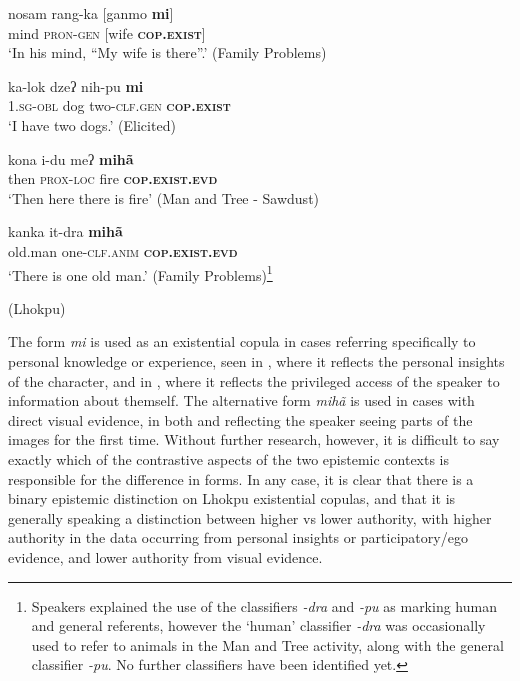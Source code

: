 \begin{exe}
       \ex\label{e:Methods:LhokpuDistinction}
       \begin{xlist}
              \ex\label{e:Methods:LhokpuDistinction:mi1}
              \gll nosam rang-ka [ganmo \textbf{mi}] \\
              mind \textsc{pron-gen} [wife \textbf{\textsc{cop.exist}}] \\
              \glt `In his mind, “My wife is there”.' (Family Problems)

              \ex \label{e:Methods:LhokpuDistinction:mi2}
              \gll ka-lok dzeʔ nih-pu \textbf{mi} \\
              \textsc{1.sg-obl} dog two-\textsc{clf.gen} \textbf{\textsc{cop.exist}} \\
              \glt `I have two dogs.' (Elicited)

              \ex \label{e:Methods:LhokpuDistinction:miha1}
              \gll kona i-du meʔ \textbf{mihã} \\
              then \textsc{prox-loc} fire \textbf{\textsc{cop.exist.evd}} \\
              \glt `Then here there is fire' (Man and Tree - Sawdust)

              \ex \label{e:Methods:LhokpuDistinction:miha2}
              \gll kanka it-dra \textbf{mihã} \\
              old.man one-\textsc{clf.anim}  \textbf{\textsc{cop.exist.evd}} \\
              \glt `There is one old man.' (Family Problems)\footnote{Speakers explained the use of the classifiers \textit{-dra} and \textit{-pu} as marking human and general referents, however the `human' classifier \textit{-dra} was occasionally used to refer to animals in the Man and Tree activity, along with the general classifier \textit{-pu}. No further classifiers have been identified yet.}
       \end{xlist}
       (Lhokpu)
\end{exe}

The form \textit{mi} is used as an existential copula in cases referring specifically to personal knowledge or experience, seen in , where it reflects the personal insights of the character, and in , where it reflects the privileged access of the speaker to information about themself. The alternative form \textit{mihã} is used in cases with direct visual evidence, in both  and  reflecting the speaker seeing parts of the images for the first time. Without further research, however, it is difficult to say exactly which of the contrastive aspects of the two epistemic contexts is responsible for the difference in forms. In any case, it is clear that there is a binary epistemic distinction on Lhokpu existential copulas, and that it is generally speaking a distinction between higher vs lower authority, with higher authority in the data occurring from personal insights or participatory/ego evidence, and lower authority from visual evidence.

